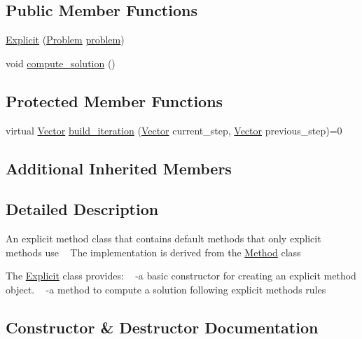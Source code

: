 \subsection*{Public Member Functions}
\begin{DoxyCompactItemize}
\item 
\hyperlink{classExplicit_a87a81a730d68689268204ae8b296075d}{Explicit} (\hyperlink{classProblem}{Problem} \hyperlink{classMethod_a29a08a679b5d30a8c813766308205041}{problem})
\item 
void \hyperlink{classExplicit_a09fa3df66e16200fefaabc908e6efafd}{compute\+\_\+solution} ()
\end{DoxyCompactItemize}
\subsection*{Protected Member Functions}
\begin{DoxyCompactItemize}
\item 
virtual \hyperlink{classVector}{Vector} \hyperlink{classExplicit_a2b9b097253488f4ce07a8ef0580a5d22}{build\+\_\+iteration} (\hyperlink{classVector}{Vector} current\+\_\+step, \hyperlink{classVector}{Vector} previous\+\_\+step)=0
\end{DoxyCompactItemize}
\subsection*{Additional Inherited Members}


\subsection{Detailed Description}
An explicit method class that contains default methods that only explicit methods use ~\newline
 The implementation is derived from the \hyperlink{classMethod}{Method} class

The \hyperlink{classExplicit}{Explicit} class provides\+: ~\newline
-\/a basic constructor for creating an explicit method object. ~\newline
-\/a method to compute a solution following explicit methods rules 

\subsection{Constructor \& Destructor Documentation}
